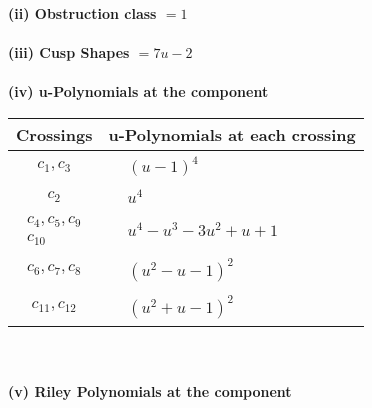 \documentclass[1p]{elsarticle_modified}
\theoremstyle{definition}
\begin{document}
\flushleft \textbf{(ii) Obstruction class $= 1$}\\~\\
\flushleft \textbf{(iii) Cusp Shapes $= 7 u-2$}\\~\\
\newpage\renewcommand{\arraystretch}{1}
\flushleft \textbf{(iv) u-Polynomials at the component}\newline \\
\begin{tabular}{m{50pt}|m{274pt}}
Crossings & \hspace{64pt}u-Polynomials at each crossing \\
\hline $$\begin{aligned}c_{1},c_{3}\end{aligned}$$&$\begin{aligned}
&(u-1)^4
\end{aligned}$\\
\hline $$\begin{aligned}c_{2}\end{aligned}$$&$\begin{aligned}
&u^4
\end{aligned}$\\
\hline $$\begin{aligned}c_{4},c_{5},c_{9}\\c_{10}\end{aligned}$$&$\begin{aligned}
&u^4- u^3-3 u^2+u+1
\end{aligned}$\\
\hline $$\begin{aligned}c_{6},c_{7},c_{8}\end{aligned}$$&$\begin{aligned}
&(u^2- u-1)^2
\end{aligned}$\\
\hline $$\begin{aligned}c_{11},c_{12}\end{aligned}$$&$\begin{aligned}
&(u^2+u-1)^2
\end{aligned}$\\
\hline
\end{tabular}\\~\\
\newpage\renewcommand{\arraystretch}{1}
\flushleft \textbf{(v) Riley Polynomials at the component}\newline \\
\end{document}
